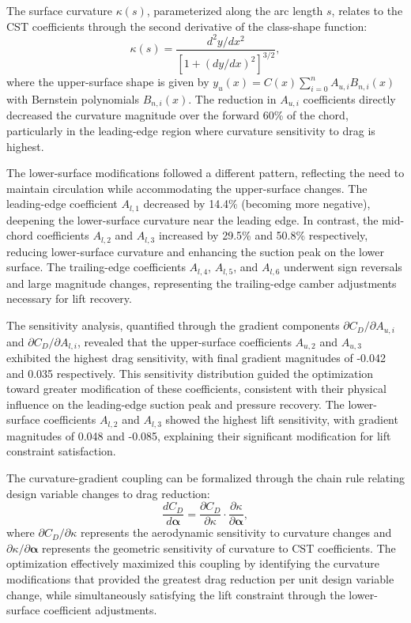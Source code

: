 The surface curvature $\kappa(s)$, parameterized along the arc length $s$, relates to the CST coefficients through the second derivative of the class-shape function:
\begin{equation}
\kappa(s) = \frac{d^2 y/dx^2}{\left[1 + (dy/dx)^2\right]^{3/2}},
\end{equation}
where the upper-surface shape is given by $y_u(x) = C(x) \sum_{i=0}^n A_{u,i} B_{n,i}(x)$ with Bernstein polynomials $B_{n,i}(x)$. The reduction in $A_{u,i}$ coefficients directly decreased the curvature magnitude over the forward 60\% of the chord, particularly in the leading-edge region where curvature sensitivity to drag is highest.

The lower-surface modifications followed a different pattern, reflecting the need to maintain circulation while accommodating the upper-surface changes. The leading-edge coefficient $A_{l,1}$ decreased by 14.4\% (becoming more negative), deepening the lower-surface curvature near the leading edge. In contrast, the mid-chord coefficients $A_{l,2}$ and $A_{l,3}$ increased by 29.5\% and 50.8\% respectively, reducing lower-surface curvature and enhancing the suction peak on the lower surface. The trailing-edge coefficients $A_{l,4}$, $A_{l,5}$, and $A_{l,6}$ underwent sign reversals and large magnitude changes, representing the trailing-edge camber adjustments necessary for lift recovery.

The sensitivity analysis, quantified through the gradient components $\partial C_D/\partial A_{u,i}$ and $\partial C_D/\partial A_{l,i}$, revealed that the upper-surface coefficients $A_{u,2}$ and $A_{u,3}$ exhibited the highest drag sensitivity, with final gradient magnitudes of -0.042 and 0.035 respectively. This sensitivity distribution guided the optimization toward greater modification of these coefficients, consistent with their physical influence on the leading-edge suction peak and pressure recovery. The lower-surface coefficients $A_{l,2}$ and $A_{l,3}$ showed the highest lift sensitivity, with gradient magnitudes of 0.048 and -0.085, explaining their significant modification for lift constraint satisfaction.

The curvature-gradient coupling can be formalized through the chain rule relating design variable changes to drag reduction:
\begin{equation}
\frac{d C_D}{d \boldsymbol{\alpha}} = \frac{\partial C_D}{\partial \kappa} \cdot \frac{\partial \kappa}{\partial \boldsymbol{\alpha}},
\end{equation}
where $\partial C_D/\partial \kappa$ represents the aerodynamic sensitivity to curvature changes and $\partial \kappa/\partial \boldsymbol{\alpha}$ represents the geometric sensitivity of curvature to CST coefficients. The optimization effectively maximized this coupling by identifying the curvature modifications that provided the greatest drag reduction per unit design variable change, while simultaneously satisfying the lift constraint through the lower-surface coefficient adjustments.

